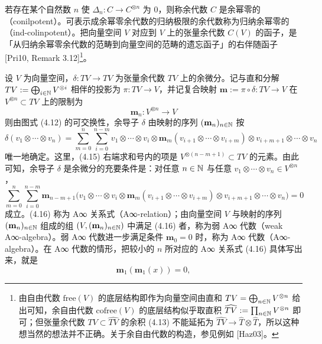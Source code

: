 若存在某个自然数 $n$ 使 $\Delta_n\colon C\to C^{\otimes n}$ 为 $0$，则称余代数 $C$ 是余幂零的（conilpotent）。可表示成余幂零余代数的归纳极限的余代数称为归纳余幂零的（ind-colinpotent）。把向量空间 $V$ 对应到 $V$ 上的张量余代数 $C(V)$ 的函子，是「从归纳余幂零余代数的范畴到向量空间的范畴的遗忘函子」的右伴随函子 [Pri10, Remark 3.12]\footnote{由自由代数 $\mathrm{free}(V)$ 的底层结构即作为向量空间由直和 $TV=\bigoplus_{n\in\mathbb{N}}V^{\otimes n}$ 给出可知，余自由代数 $\mathrm{cofree}(V)$ 的底层结构似乎取直积 $\widehat{TV}:=\prod_{n\in\mathbb{N}}V^{\otimes n}$ 即可；但张量余代数 $TV\subset\widehat{TV}$ 的余积 (4.13) 不能延拓为 $\widehat{TV}\to\widehat{T}\otimes\widehat{T}$，所以这种想当然的想法并不正确。关于余自由代数的构造，参见例如 [Haz03]。}。

设 $V$ 为向量空间，$\delta\colon TV\to TV$ 为张量余代数 $TV$ 上的余微分。记与直和分解 $TV:=\bigoplus_{i\in\mathbb{N}}V^{\otimes i}$ 相伴的投影为 $\pi\colon TV\to V$，并记复合映射 $\mathbf{m}:=\pi\circ\delta\colon TV\to V$ 在 $V^{\otimes n}\subset TV$ 上的限制为
\begin{equation}
  \mathbf{m}_n\colon V^{\otimes n}\to V \tag{4.14}
\end{equation}
则由图式 (4.12) 的可交换性，余导子 $\delta$ 由映射的序列 $(\mathbf{m}_n)_{n\in\mathbb{N}}$ 按
\begin{equation}
  \delta(v_1\otimes\cdots\otimes v_n)
  = \sum_{m=0}^{n}\sum_{i=0}^{n-m}
  v_1\otimes\cdots\otimes v_i\otimes \mathbf{m}_m(v_{i+1}\otimes\cdots\otimes v_{i+m})
  \otimes v_{i+m+1}\otimes\cdots\otimes v_n \tag{4.15}
\end{equation}
唯一地确定。这里，(4.15) 右端求和号内的项是 $V^{\otimes(n-m+1)}\subset TV$ 的元素。由此可知，余导子 $\delta$ 是余微分的充要条件是：对任意 $n\in\mathbb{N}$ 与任意 $v_1\otimes\cdots\otimes v_n\in V^{\otimes n}$，
\begin{equation}
  \sum_{m=0}^{n}\sum_{i=0}^{n-m}
  \mathbf{m}_{n-m+1}\bigl(v_1\otimes\cdots\otimes v_i\otimes \mathbf{m}_m(v_{i+1}\otimes\cdots\otimes v_{i+m})
  \otimes v_{i+m+1}\otimes\cdots\otimes v_n\bigr) = 0 \tag{4.16}
\end{equation}
成立。(4.16) 称为 A∞ 关系式（A∞-relation）；由向量空间 $V$ 与映射的序列 $(\mathbf{m}_n)_{n\in\mathbb{N}}$ 组成的组 $(V,(\mathbf{m}_n)_{n\in\mathbb{N}})$ 中满足 (4.16) 者，称为弱 A∞ 代数（weak A∞-algebra）。弱 A∞ 代数进一步满足条件 $\mathbf{m}_0=0$ 时，称为 A∞ 代数（A∞-algebra）。在 A∞ 代数的情形，把较小的 $n$ 所对应的 A∞ 关系式 (4.16) 具体写出来，就是
\begin{equation}
  \mathbf{m}_1(\mathbf{m}_1(x)) = 0, \tag{4.17}
\end{equation}
